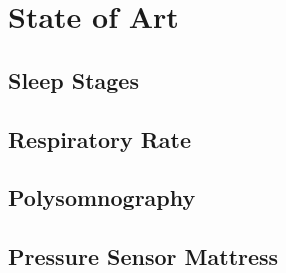 \chapter{State of Art}
\section{Sleep Stages}
\section{Respiratory Rate}
\section{Polysomnography}
\section{Pressure Sensor Mattress}